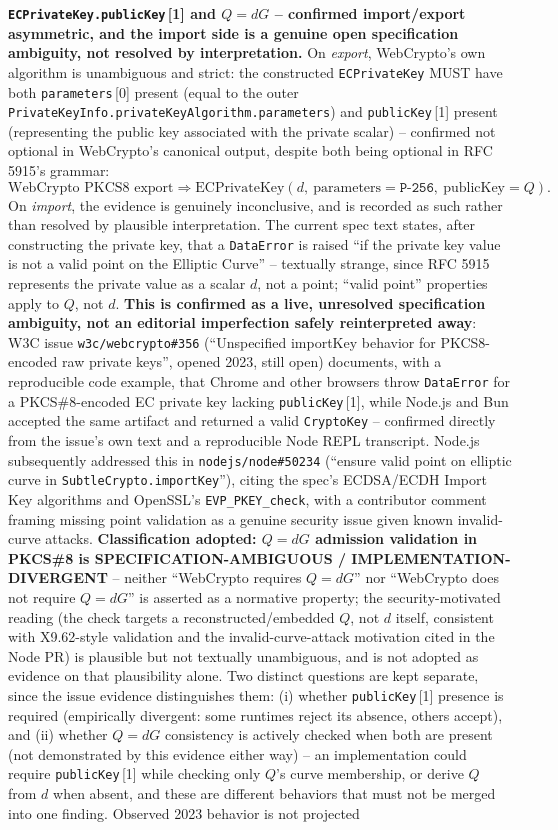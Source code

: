 \documentclass[11pt,a4paper]{article}
\begin{document}
\textbf{\texttt{ECPrivateKey.publicKey}\,[1] and $Q=dG$ -- confirmed import/export asymmetric, and the import side is a genuine open specification ambiguity, not resolved by interpretation.} On \emph{export}, WebCrypto's own algorithm is unambiguous and strict: the constructed \texttt{ECPrivateKey} MUST have both \texttt{parameters}\,[0] present (equal to the outer \texttt{PrivateKeyInfo.privateKeyAlgorithm.parameters}) and \texttt{publicKey}\,[1] present (representing the public key associated with the private scalar) -- confirmed not optional in WebCrypto's canonical output, despite both being optional in RFC 5915's grammar:
\[
\text{WebCrypto PKCS8 export} \Rightarrow \text{ECPrivateKey}(d,\ \text{parameters}=\texttt{P-256},\ \text{publicKey}=Q).
\]
On \emph{import}, the evidence is genuinely inconclusive, and is recorded as such rather than resolved by plausible interpretation. The current spec text states, after constructing the private key, that a \texttt{DataError} is raised ``if the private key value is not a valid point on the Elliptic Curve'' -- textually strange, since RFC 5915 represents the private value as a scalar $d$, not a point; ``valid point'' properties apply to $Q$, not $d$. \textbf{This is confirmed as a live, unresolved specification ambiguity, not an editorial imperfection safely reinterpreted away}: W3C issue \texttt{w3c/webcrypto\#356} (``Unspecified importKey behavior for PKCS8-encoded raw private keys'', opened 2023, still open) documents, with a reproducible code example, that Chrome and other browsers throw \texttt{DataError} for a PKCS\#8-encoded EC private key lacking \texttt{publicKey}\,[1], while Node.js and Bun accepted the same artifact and returned a valid \texttt{CryptoKey} -- confirmed directly from the issue's own text and a reproducible Node REPL transcript. Node.js subsequently addressed this in \texttt{nodejs/node\#50234} (``ensure valid point on elliptic curve in \texttt{SubtleCrypto.importKey}''), citing the spec's ECDSA/ECDH Import Key algorithms and OpenSSL's \texttt{EVP\_PKEY\_check}, with a contributor comment framing missing point validation as a genuine security issue given known invalid-curve attacks. \textbf{Classification adopted: $Q=dG$ admission validation in PKCS\#8 is SPECIFICATION-AMBIGUOUS / IMPLEMENTATION-DIVERGENT} -- neither ``WebCrypto requires $Q=dG$'' nor ``WebCrypto does not require $Q=dG$'' is asserted as a normative property; the security-motivated reading (the check targets a reconstructed/embedded $Q$, not $d$ itself, consistent with X9.62-style validation and the invalid-curve-attack motivation cited in the Node PR) is plausible but not textually unambiguous, and is not adopted as evidence on that plausibility alone. Two distinct questions are kept separate, since the issue evidence distinguishes them: (i) whether \texttt{publicKey}\,[1] presence is required (empirically divergent: some runtimes reject its absence, others accept), and (ii) whether $Q=dG$ consistency is actively checked when both are present (not demonstrated by this evidence either way) -- an implementation could require \texttt{publicKey}\,[1] while checking only $Q$'s curve membership, or derive $Q$ from $d$ when absent, and these are different behaviors that must not be merged into one finding. Observed 2023 behavior is not projected 
\end{document}
